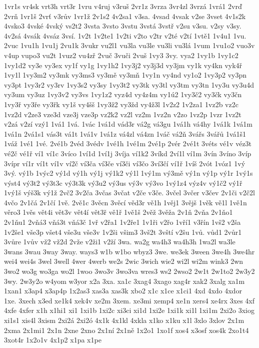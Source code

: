 1vr1s
vr4sk
vrt3h
vrt3r
1vru
v4ruj
v3ruš
2vr1z
3vrza
3vr4zl
3vrzá
1vrá1
2vrď
2vrň
1vr1š
2vrť
v3rův
1vr1ž
2v1s2
4v2sa1
v3sa.
4vsad
4vsak
v2se
3vset
4v1s2k
4vsko3
4vské
4vský
vs2t2
3vsta
3vsto
3vstu
3vstá
3vstř
v2su
v3su.
v2sy
v3sy.
4v2sá
4vsák
4vsáz
3vsí.
1v2t
1v2te1
1v2ti
v2to
v2tr
v2té
v2tí
1vtě1
1v4u1
1vu.
2vuc
1vu1h
1vu1j
2vu1k
3vukr
vu2l1
vu3la
vu3le
vu3li
vu3lá
1vum
1vu1o2
vuo3v
v4up
vupo3
vu2t
1vuz2
vu4zř
2vuč
3vuči
2vuš
1vy3
3vy.
vya2
1vy1b
1vy1c2
1vy1d2
vy3e
vy3ex
vy1f
vy1g
1vy1h2
1vy3j2
vy3j3d
vy3jm
vy1k
vy4kn
vyk4ř
1vy1l
1vy3m2
vy3mk
vy3ms3
vy3mě
vy3mň
1vy1n
vy4nd
vy1o2
1vy3p2
vy3pn
vy3pt
1vy3r2
vy3rv
1vy3s2
vy3sy
1vy3t2
vy3tk
vy3tl
vy3tm
vy3tn
1vy3u
vy3u4d
vy3um
vy3uz
1vy3v2
vy3vs
1vy1z2
vyz4d
vy4z4m
vy1ú2
1vy3č2
vy3čk
vy3čn
1vy3ř
vy3ře
vy3řk
vy1š
vy4šš
1vy3ž2
vy3žd
vy4ž3l
1v2z2
1v2za1
1vz2b
vz2c
1vz2d
v2ze3
vze3d
vze3j
vze3p
vz2k2
vz2l
vz2m
1vz2n
v2zo
1vz2p
1vzr
1vz2t
v2zá
v2zí
vzý1
1vá1
1vá.
1vác
1vá1d
vád3r
vá2g
vá3gu
1vá1h
vá4hy
1vá1k
1vá1m
1vá1n
2vá1s1
vás3t
vá1t
1vá1v
1vá1z
vá4zl
vá4zn
1váč
vá2ň
3vářs
3vářů
1vá1š1
1váž
1vé1
1vé.
2vé1b
2véd
3védv
1vé1h
1vé1m
2vé1p
2vér
2vé1t
3véts
vé1v
véz3t
vé2č
vé1ř
ví1
ví1c
3víco
1ví1d
1ví1j
3víja
ví1k2
3víkd
2ví1l
ví1m
3vín
3víno
3víp
3vípr
ví1r
ví1t
ví1v
ví2č
ví3ča
ví3če
ví3či
ví3čo
3ví3čí
ví1ř
1víš
2vót
1vóz1
1vý
3vý.
vý1b
1výc2
vý1d
vý1h
vý1j
vý1k2
vý1l
1vý1m
vý3mě
vý1n
vý1p
vý1r
1vý1s
výst4
vý3t2
vý3t3c
vý3t3k
vý3u2
vý3us
vý3v
vý3vo
1vý1z4
výz4v
vý1č2
vý1ř
1vý1š
výš3k
vý1ž
2vč2
3v2ča
3včas
3včat
v2če
v3če.
3včel
3včer
v3čev
2v1či
v2č2l
4včo
2v1čá
2v1čí
1vě.
2vě1c
3věcn
3věcí
věd3r
vě1h
1věj1
3vějš
1věk
vě1l
1vě1n
věro3
1věs
vět4i
vět3v
vět4í
vět3ř
vě1ř
1vě1š
2věž
3věža
2v1ň
2vňa
2v1ňo1
2v1ňu1
2vňá3
vňá3t
vňá3č
1vř
v2řa1
1v2ře1
1v1ři
v2řo
1vří1
v3řín
1vš2
v2ša
1v2še1
vše3p
všet4
vše3u
vše3v
1v2ši
všim3
3vš2t
3vští
v2šu
1vů.
vůd1
2vůr1
3vůre
1vův
vž2
vž2d
2vže
v2ži1
v2ží
3wa.
wa2g
wa4h3
wa4h3h
1wa2l
wa3le
3wans
3wau
3way
3way.
ways3
w1b
w1bo
wbyz3
3we.
we3ek
3ween
3we4h
3we4hr
wei4
wei4s
3wel
3well
4wer
4werb
we2s
2wic
3wich
wie2
wi2l
wi2m
wink3
2wn
3wo2
wo3g
wo3ga
wo2l
1woo
3wo3v
3wo3va
wres3
ws2
2wso2
2w1t
2w1to2
2w3y2
3wy.
2w3y2o
w4yom
w3yor
x2a
3xa.
xa1c
3xag4
3xago
xag4r
xak2
3xalg
xa1m
1xan1
x3ap4
x3ap4p
1x2as3
xas3a
xas3k
xbo2
x1c
x1ce
x1ci1
4xd
4xdo
4xdor
1xe.
3xech
x3ed
xe1k4
xek4v
xe2m
3xem.
xe3mi
xemp4
xe1n
xers4
xe4rx
3xes
4xf
4xfe
4xfer
x1h
x1hi1
xi1
1xi1b
1xi2c
xi3ci
xi1d
1xi2e
1xi1k
xi1l
1xi1m
2xi2o
3xiog
xi1s1
xis4l
3xism
2xi2á
2xi2ó
4x1k
4x1kl
4xkla
x1ko
x1ku
x1l
3xlo
3xlov
2x1m
2xma
2x1mi1
2x1n
2xne
2xno
2x1ní
2x1ně
1x2o1
1xo1f
xos4
x3osf
xos4k
2xo1t4
3xot4r
1x2o1v
4x1p2
x1pa
x1pe
